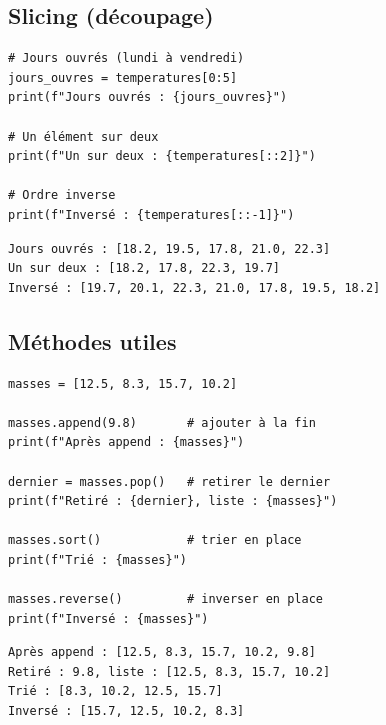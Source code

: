 \subsection{Slicing (d\'ecoupage)}

\begin{codeblock}[title=\textbf{Python}]
\begin{verbatim}
# Jours ouvrés (lundi à vendredi)
jours_ouvres = temperatures[0:5]
print(f"Jours ouvrés : {jours_ouvres}")

# Un élément sur deux
print(f"Un sur deux : {temperatures[::2]}")

# Ordre inverse
print(f"Inversé : {temperatures[::-1]}")
\end{verbatim}
\end{codeblock}

\begin{codeoutput}
\begin{verbatim}
Jours ouvrés : [18.2, 19.5, 17.8, 21.0, 22.3]
Un sur deux : [18.2, 17.8, 22.3, 19.7]
Inversé : [19.7, 20.1, 22.3, 21.0, 17.8, 19.5, 18.2]
\end{verbatim}
\end{codeoutput}

\subsection{M\'ethodes utiles}

\begin{codeblock}[title=\textbf{Python}]
\begin{verbatim}
masses = [12.5, 8.3, 15.7, 10.2]

masses.append(9.8)       # ajouter à la fin
print(f"Après append : {masses}")

dernier = masses.pop()   # retirer le dernier
print(f"Retiré : {dernier}, liste : {masses}")

masses.sort()            # trier en place
print(f"Trié : {masses}")

masses.reverse()         # inverser en place
print(f"Inversé : {masses}")
\end{verbatim}
\end{codeblock}

\begin{codeoutput}
\begin{verbatim}
Après append : [12.5, 8.3, 15.7, 10.2, 9.8]
Retiré : 9.8, liste : [12.5, 8.3, 15.7, 10.2]
Trié : [8.3, 10.2, 12.5, 15.7]
Inversé : [15.7, 12.5, 10.2, 8.3]
\end{verbatim}
\end{codeoutput}

